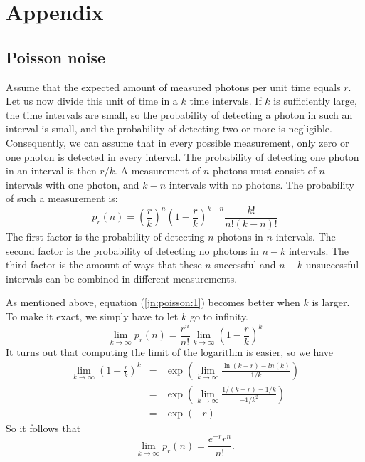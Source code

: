 \chapter{Appendix}

\section{Poisson noise  \label{app:poisson}}
Assume that the expected amount of measured photons per unit time equals $r$.
Let us now divide this unit of time in a $k$ time intervals. If $k$ is
sufficiently large, the time intervals are small, so the probability of
detecting a photon in such an interval is small, and the probability of
detecting two or more is negligible. Consequently, we can assume that in every
possible measurement, only zero or one photon is detected in every
interval. The probability of detecting one photon in an interval is then $r /
k$. A measurement of $n$ photons must consist of $n$ intervals with one
photon, and $k - n$ intervals with no photons. The probability of such a
measurement is:
\begin{equation}
p_r(n) = \left( \frac{r}{k} \right)^n \left(1 - \frac{r}{k} \right)^{k-n}
       \frac{k!}{n!(k-n)!}  \label{jn:poisson:1}
\end{equation}
The first factor is the probability of detecting $n$ photons in $n$ intervals.
The second factor is the probability of detecting no photons in $n - k$
intervals.  The third factor is the amount of ways that these $n$ successful
and $n-k$ unsuccessful intervals can be combined in different measurements.

As mentioned above, equation (\ref{jn:poisson:1}) becomes better when $k$ is
larger.  To make it exact, we simply have to let $k$ go to infinity.
\begin{equation}
  \lim_{k \rightarrow \infty} p_r(n) 
  = \frac{r^n}{n!} \lim_{k \rightarrow \infty} \left( 1 - \frac{r}{k} \right)^k
\end{equation}
It turns out that computing the limit of the logarithm is easier, so we have
\begin{eqnarray}
  \lim_{k \rightarrow \infty} \left( 1 - \frac{r}{k} \right)^k
 & = &
 \exp \left(\lim_{k \rightarrow \infty} \frac{\ln(k - r) - ln(k)}{1/k}  \right)
\nonumber\\
& = & 
  \exp \left(\lim_{k \rightarrow \infty}  
  \frac{1/ (k-r) - 1/k}{-1/k^2} \right) \nonumber \\
& = & \exp (-r)
\end{eqnarray}
So it follows that 
\begin{equation}
  \lim_{k \rightarrow \infty} p_r(n) = \frac{e^{-r} r^n}{n!}. 
\end{equation}

